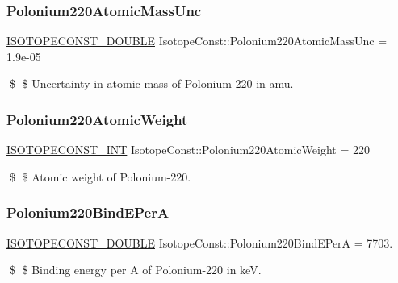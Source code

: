 \subsubsection{\texorpdfstring{Polonium220\+Atomic\+Mass\+Unc}{Polonium220AtomicMassUnc}}
{\footnotesize\ttfamily \mbox{\hyperlink{group___isotope_const-_macros_ga8f45a7272ce02c0b4c65c44636ed719a}{I\+S\+O\+T\+O\+P\+E\+C\+O\+N\+S\+T\+\_\+\+D\+O\+U\+B\+LE}} Isotope\+Const\+::\+Polonium220\+Atomic\+Mass\+Unc = 1.\+9e-\/05}

\$ \$ Uncertainty in atomic mass of Polonium-\/220 in amu. \mbox{\label{group___isotope_const-_polonium-_po220_gae7c39a3a77e0950ca59df7ea563eb1ed}} 
\subsubsection{\texorpdfstring{Polonium220\+Atomic\+Weight}{Polonium220AtomicWeight}}
{\footnotesize\ttfamily \mbox{\hyperlink{group___isotope_const-_macros_ga5f18360b3e99483a35c32d789e62621c}{I\+S\+O\+T\+O\+P\+E\+C\+O\+N\+S\+T\+\_\+\+I\+NT}} Isotope\+Const\+::\+Polonium220\+Atomic\+Weight = 220}

\$ \$ Atomic weight of Polonium-\/220. \mbox{\label{group___isotope_const-_polonium-_po220_ga4574b6d94790ccbd4778e1a7557afe02}} 
\subsubsection{\texorpdfstring{Polonium220\+Bind\+E\+PerA}{Polonium220BindEPerA}}
{\footnotesize\ttfamily \mbox{\hyperlink{group___isotope_const-_macros_ga8f45a7272ce02c0b4c65c44636ed719a}{I\+S\+O\+T\+O\+P\+E\+C\+O\+N\+S\+T\+\_\+\+D\+O\+U\+B\+LE}} Isotope\+Const\+::\+Polonium220\+Bind\+E\+PerA = 7703.}

\$ \$ Binding energy per A of Polonium-\/220 in keV. \mbox{\label{group___isotope_const-_polonium-_po220_gae7a7790770948f25602a9533c906e851}} 
